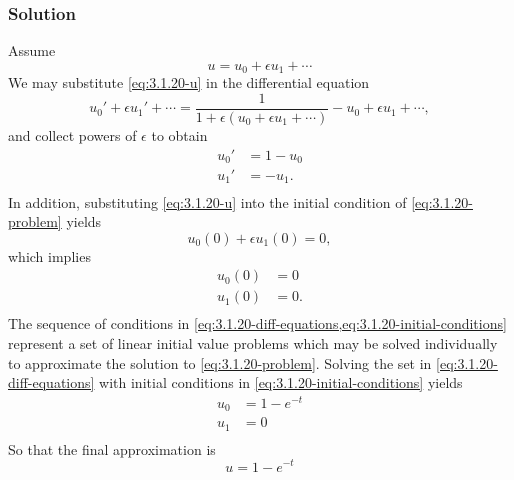 \documentclass[12pt,twoside]{article}
\begin{document}
\subsubsection*{Solution}
Assume
\begin{equation}
  \label{eq:3.1.20-u}
  u = u_0 + \epsilon u_1 + \cdots
\end{equation}
We may substitute \cref{eq:3.1.20-u} in the differential equation
\begin{equation*}
  u_0'+\epsilon u_1'+\cdots = \frac{1}{1+\epsilon(u_0+\epsilon u_1+\cdots)}
  - u_0+\epsilon u_1+\cdots,
\end{equation*}
and collect powers of $\epsilon$ to obtain
\begin{equation}
  \begin{aligned}
    \label{eq:3.1.20-diff-equations}
    u_0' &= 1-u_0 \\
    u_1' &= -u_1. \\
  \end{aligned}
\end{equation}
In addition, substituting \cref{eq:3.1.20-u} into the initial condition of
\cref{eq:3.1.20-problem} yields
\begin{equation*}
  u_0(0)+\epsilon u_1(0) = 0,
\end{equation*}
which implies
\begin{equation}
  \label{eq:3.1.20-initial-conditions}
  \begin{aligned}
    u_0(0) &= 0 \\
    u_1(0) &= 0. \\
  \end{aligned}
\end{equation}
The sequence of conditions in
\cref{eq:3.1.20-diff-equations,eq:3.1.20-initial-conditions} represent a set of
linear initial value problems which may be solved individually to approximate
the solution to \cref{eq:3.1.20-problem}. Solving the set in
\cref{eq:3.1.20-diff-equations} with initial conditions in
\cref{eq:3.1.20-initial-conditions} yields
\begin{equation*}
  \begin{aligned}
    u_0 &= 1-e^{-t} \\
    u_1 &= 0 \\
  \end{aligned}
\end{equation*}
So that the final approximation is
\begin{equation*}
  \boxed{
    u = 1-e^{-t}
  }
\end{equation*}
\end{document}
